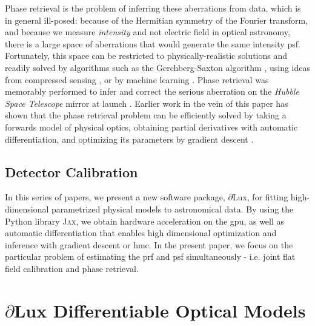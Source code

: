 \documentclass[]{spie}
\newcommand\dlux{$\partial$Lux\xspace}
\begin{document}
Phase retrieval is the problem of inferring these aberrations from data, which is in general ill-posed: because of the Hermitian symmetry of the Fourier transform, and because we measure \textit{intensity} and not electric field in optical astronomy, there is a large space of aberrations that would generate the same intensity \ac{psf}. Fortunately, this space can be restricted to physically-realistic solutions and readily solved by algorithms such as the Gerchberg-Saxton algorithm \cite{gerchberg1972}, using ideas from compressed sensing \cite{candes2011}, or by machine learning \cite{metzler2018,isil2019,nishizaki2020}.  Phase retrieval was memorably performed to infer and correct the serious aberration on the \textit{Hubble Space Telescope} mirror at launch \cite{hubble_phase_ret}. 
Earlier work in the vein of this paper has shown that the phase retrieval problem can be efficiently solved by taking a forwards model of physical optics, obtaining partial derivatives with automatic differentiation, and optimizing its parameters by gradient descent \cite{jurling_fienup,phase_ret_and_design}.

\subsection{Detector Calibration}

In this series of papers, we present a new software package, \dlux, for fitting high-dimensional parametrized physical models to astronomical data. By using the Python library \textsc{Jax}\cite{jax}, we obtain hardware acceleration on the \ac{gpu}, as well as automatic differentiation that enables high dimensional optimization and inference with gradient descent or \ac{hmc}. In the present paper, we focus on the particular problem of estimating the \ac{prf} and \ac{psf} simultaneously - i.e. joint flat field calibration and phase retrieval.


\section{\dlux Differentiable Optical Models}
\label{sec:dlux}

\end{document}
